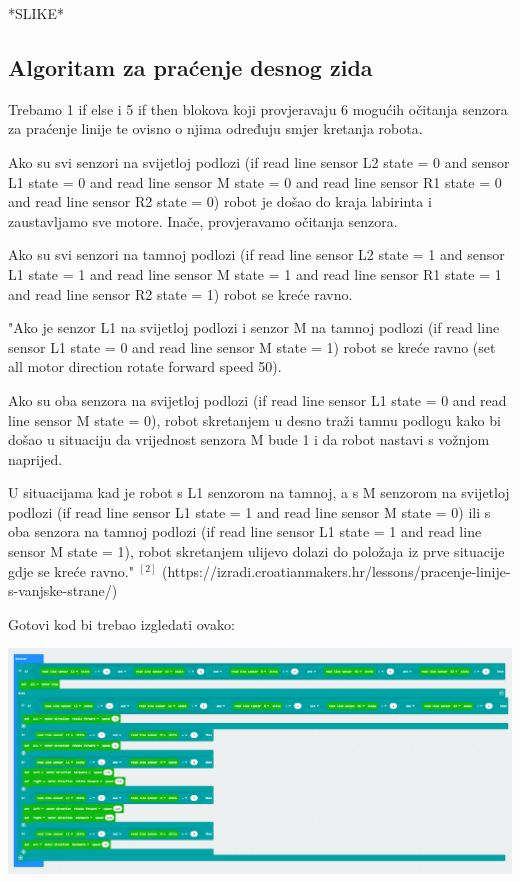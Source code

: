 
\iffalse
    *SLIKE*

\subsection{Algoritam za praćenje desnog zida}


Trebamo 1 if else i 5 if then blokova koji provjeravaju 6 mogućih očitanja senzora za praćenje linije te ovisno o njima određuju smjer kretanja robota.

Ako su svi senzori na svijetloj podlozi (if read line sensor L2 state = 0 and sensor L1 state = 0 and read line sensor M state = 0 and read line sensor R1 state = 0 and read line sensor R2 state = 0) robot je došao do kraja labirinta i zaustavljamo sve motore. Inače, provjeravamo očitanja senzora.

Ako su svi senzori na tamnoj podlozi (if read line sensor L2 state = 1 and sensor L1 state = 1 and read line sensor M state = 1 and read line sensor R1 state = 1 and read line sensor R2 state = 1) robot se kreće ravno.

"Ako je senzor L1 na svijetloj podlozi i senzor M na tamnoj podlozi (if read line sensor L1 state = 0 and read line sensor M state = 1) robot se kreće ravno (set all motor direction rotate forward speed 50).

Ako su oba senzora na svijetloj podlozi (if read line sensor L1 state = 0 and read line sensor M state = 0), robot skretanjem u desno traži tamnu podlogu kako bi došao u situaciju da vrijednost senzora M bude 1 i da robot nastavi s vožnjom naprijed.

U situacijama kad je robot s L1 senzorom na tamnoj, a s M senzorom na svijetloj podlozi (if read line sensor L1 state = 1 and read line sensor M state = 0) ili s oba senzora na tamnoj podlozi (if read line sensor L1 state = 1 and read line sensor M state = 1), robot skretanjem ulijevo dolazi do položaja iz prve situacije gdje se kreće ravno." $^{[2]}$ (https://izradi.croatianmakers.hr/lessons/pracenje-linije-s-vanjske-strane/)

Gotovi kod bi trebao izgledati ovako:

\includegraphics[scale=0.6]{pracenje-desnog-zida}

